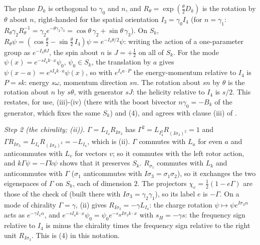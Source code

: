 The plane $D_{k}$ is orthogonal to $\gamma_{0}$ and $n$, and $R_{\theta} = \exp(\tfrac{\theta}{2}D_{k})$ is the rotation by $\theta$ about $n$, right-handed for the spatial orientation $I_{3} = \gamma_{0}I_{4}$ (for $n = \gamma_{1}$: $R_{\theta}\gamma_{2}R_{\theta}^{-1} = \gamma_{2}e^{-\theta\gamma_{2}\gamma_{3}} = \cos\theta\,\gamma_{2} + \sin\theta\,\gamma_{3}$). On $S_{k}$, $R_{\theta}\psi = (\cos\tfrac{\theta}{2} - \sin\tfrac{\theta}{2}\,I_{4})\psi = e^{-I_{4}\theta/2}\psi$: writing the action of a one-parameter group as $e^{-I_{4}\theta J}$, the spin about $n$ is $J = +\tfrac12$ on all of $S_{k}$. For the mode $\psi(x) = e^{-sI_{4}k\cdot x}\psi_{0}$, $\psi_{0} \in S_{k}$, the translation by $a$ gives $\psi(x - a) = e^{sI_{4}k\cdot a}\psi(x)$, so with $e^{I_{4}a\cdot P}$ the energy-momentum relative to $I_{4}$ is $P = sk$: energy $s\omega$, momentum direction $sn$. The rotation about $sn$ by $\theta$ is the rotation about $n$ by $s\theta$, with generator $sJ$: the helicity relative to $I_{4}$ is $s/2$. This restates, for use, (iii)-(iv) (there with the boost bivector $n\gamma_{0} = -B_{k}$ of the generator, which fixes the same $S_{k}$) and (4), and agrees with clause (iii) of .

\emph{Step 2 (the chirality; (ii)).} $\Gamma = L_{I_{4}}R_{I\sigma_{3}}$ has $\Gamma^{2} = L_{I_{4}^{2}}R_{(I\sigma_{3})^{2}} = 1$ and $\Gamma R_{I\sigma_{3}} = L_{I_{4}}R_{(I\sigma_{3})^{2}} = -L_{I_{4}}$, which is (ii). $\Gamma$ commutes with $L_{a}$ for even $a$ and anticommutes with $L_{v}$ for vectors $v$; so it commutes with the left rotor action, and $k\Gamma\psi = -\Gamma k\psi$ shows that it preserves $S_{k}$. $R_{\sigma_{1}}$ commutes with $L_{k}$ and anticommutes with $\Gamma$ ($\sigma_{1}$ anticommutes with $I\sigma_{3} = \sigma_{1}\sigma_{2}$), so it exchanges the two eigenspaces of $\Gamma$ on $S_{k}$, each of dimension $2$. The projectors $\chi_{e} = \tfrac12(1 - e\Gamma)$ are those of the check of  (built there with $I\sigma_{3} = \gamma_{2}\gamma_{1}$), so its label $e$ is $-\Gamma$. On a mode of chirality $\Gamma = \gamma$, (ii) gives $R_{I\sigma_{3}} = -\gamma L_{I_{4}}$: the charge rotation $\psi \mapsto \psi e^{I\sigma_{3}\alpha}$ acts as $e^{-\gamma I_{4}\alpha}$, and $e^{-sI_{4}k\cdot x}\psi_{0} = \psi_{0}e^{-s_{H}I\sigma_{3}k\cdot x}$ with $s_{H} = -\gamma s$: the frequency sign relative to $I_{4}$ is minus the chirality times the frequency sign relative to the right unit $R_{I\sigma_{3}}$. This is (4) in this notation.

